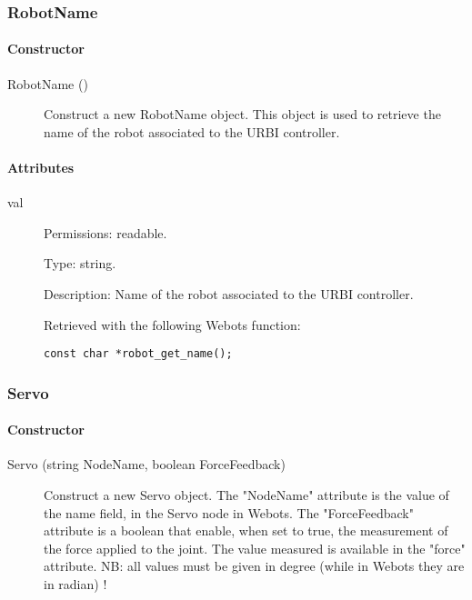 \subsubsection{RobotName}
\label{webots.uobjects.robotdevices.robotname}%

\paragraph{Constructor}
\label{webots.uobjects.robotdevices.robotname.constructor}%

\noindent
\begin{description}
\item[{RobotName ()}]     Construct a new RobotName object. This object is used to retrieve the name of the
          robot associated to the URBI controller.

\end{description}

\paragraph{Attributes}
\label{webots.uobjects.robotdevices.robotname.attributes}%

\noindent
\begin{description}
\item[{         val
 }]            Permissions: readable.


 Type: string.


 Description: Name of the robot associated to the URBI controller.


 Retrieved with the following Webots function:


\begin{lstlisting}
const char *robot_get_name();
\end{lstlisting}
\end{description}

\subsubsection{Servo}
\label{webots.uobjects.robotdevices.servo}%

\paragraph{Constructor}
\label{webots.uobjects.robotdevices.servo.constructor}%

\noindent
\begin{description}
\item[{Servo (string NodeName, boolean ForceFeedback)}] Construct a new Servo object. The "NodeName" attribute is the value
          of the name field, in the Servo node in Webots. The "ForceFeedback" attribute
          is a boolean that enable, when set to true, the measurement of the force applied
          to the joint. The value measured is available in the "force" attribute.
          NB: all values must be given in degree (while in Webots they are in radian) !

\end{description}

